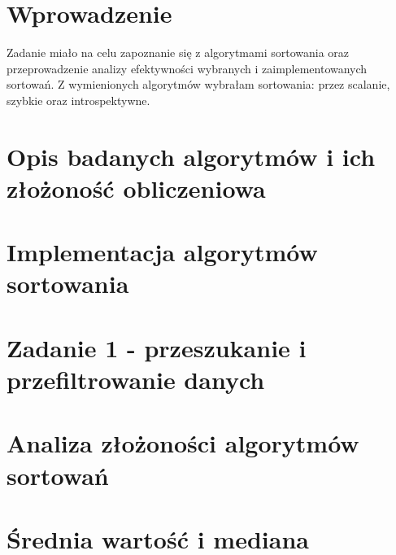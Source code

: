 \documentclass[12pt]{article}
\begin{document}
\renewcommand{\figurename}{Rys.}
\renewcommand{\tablename}{Tab.}
    

\tableofcontents
\newpage

\section{Wprowadzenie}
Zadanie miało na celu zapoznanie się z algorytmami sortowania oraz przeprowadzenie analizy efektywności wybranych i zaimplementowanych sortowań. Z wymienionych algorytmów wybrałam sortowania: przez scalanie, szybkie oraz introspektywne. 

\section{Opis badanych algorytmów i ich złożoność obliczeniowa}


\section{Implementacja algorytmów sortowania}


\section{Zadanie 1 - przeszukanie i przefiltrowanie danych}


\section{Analiza złożoności algorytmów sortowań}


\section{Średnia wartość i mediana}

\end{document}

